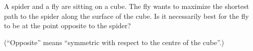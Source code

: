 A spider and a fly are sitting on a cube. The fly wants to maximize the shortest path to the spider along the surface of the cube. Is it necessarily best for the fly to be at the point opposite to the spider?

(“Opposite” means “symmetric with respect to the centre of the cube”.)